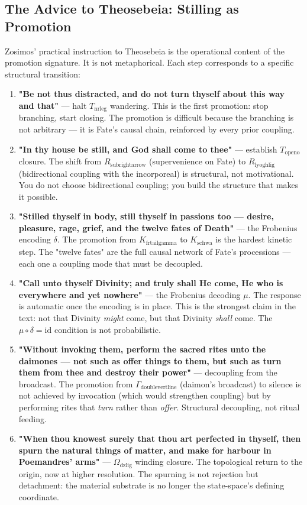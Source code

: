 \documentclass[12pt,a4paper]{article}
\begin{document}
\subsection{The Advice to Theosebeia: Stilling as Promotion}

Zosimos' practical instruction to Theosebeia is the operational content of the promotion signature. It is not metaphorical. Each step corresponds to a specific structural transition:

\begin{enumerate}
    \item \textbf{"Be not thus distracted, and do not turn thyself about this way and that"} --- halt $T_{\text{nrleg}}$ wandering. This is the first promotion: stop branching, start closing. The promotion is difficult because the branching is not arbitrary --- it is Fate's causal chain, reinforced by every prior coupling.
    \item \textbf{"In thy house be still, and God shall come to thee"} --- establish $T_{\text{openo}}$ closure. The shift from $R_{\text{subrightarrow}}$ (supervenience on Fate) to $R_{\text{lyoghlig}}$ (bidirectional coupling with the incorporeal) is structural, not motivational. You do not choose bidirectional coupling; you build the structure that makes it possible.
    \item \textbf{"Stilled thyself in body, still thyself in passions too --- desire, pleasure, rage, grief, and the twelve fates of Death"} --- the Frobenius encoding $\delta$. The promotion from $K_{\text{frtailgamma}}$ to $K_{\text{schwa}}$ is the hardest kinetic step. The "twelve fates" are the full causal network of Fate's processions --- each one a coupling mode that must be decoupled.
    \item \textbf{"Call unto thyself Divinity; and truly shall He come, He who is everywhere and yet nowhere"} --- the Frobenius decoding $\mu$. The response is automatic once the encoding is in place. This is the strongest claim in the text: not that Divinity \emph{might} come, but that Divinity \emph{shall} come. The $\mu \circ \delta = \text{id}$ condition is not probabilistic.
    \item \textbf{"Without invoking them, perform the sacred rites unto the daimones --- not such as offer things to them, but such as turn them from thee and destroy their power"} --- decoupling from the broadcast. The promotion from $\Gamma_{\text{doublevertline}}$ (daimon's broadcast) to silence is not achieved by invocation (which would strengthen coupling) but by performing rites that \emph{turn} rather than \emph{offer}. Structural decoupling, not ritual feeding.
    \item \textbf{"When thou knowest surely that thou art perfected in thyself, then spurn the natural things of matter, and make for harbour in Poemandres' arms"} --- $\Omega_{\text{dzlig}}$ winding closure. The topological return to the origin, now at higher resolution. The spurning is not rejection but detachment: the material substrate is no longer the state-space's defining coordinate.
\end{enumerate}
\end{document}
